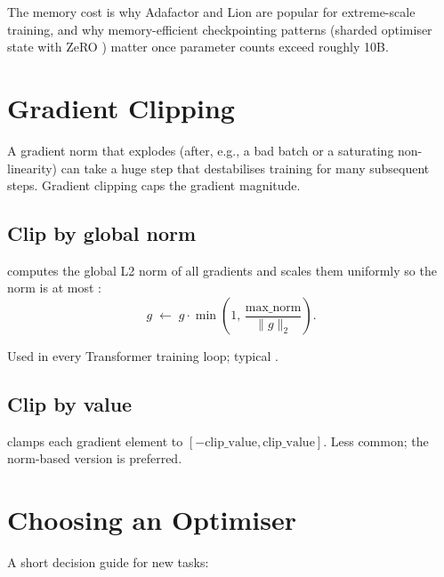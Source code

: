 The memory cost is why Adafactor and Lion are popular for
extreme-scale training, and why memory-efficient checkpointing
patterns (sharded optimiser state with ZeRO
\cite{rajbhandari_zero_2020}) matter once parameter counts exceed
roughly 10B.

\section{Gradient Clipping}
\label{sec:optimizers:grad_clip}

A gradient norm that explodes (after, e.g., a bad batch or a
saturating non-linearity) can take a huge step that destabilises
training for many subsequent steps. Gradient clipping caps the
gradient magnitude.

\subsection{Clip by global norm}
\label{ssec:optimizers:clip_norm}

computes the global L2 norm of all gradients and scales them
uniformly so the norm is at most :
\[
g \;\leftarrow\; g \cdot \min\!\left(1,\, \frac{\text{max\_norm}}{\|g\|_2}\right).
\]

Used in every Transformer training loop; typical
.

\subsection{Clip by value}
\label{ssec:optimizers:clip_value}

 clamps each
gradient element to $[-\text{clip\_value}, \text{clip\_value}]$.
Less common; the norm-based version is preferred.

\section{Choosing an Optimiser}
\label{sec:optimizers:choosing}

A short decision guide for new tasks:

